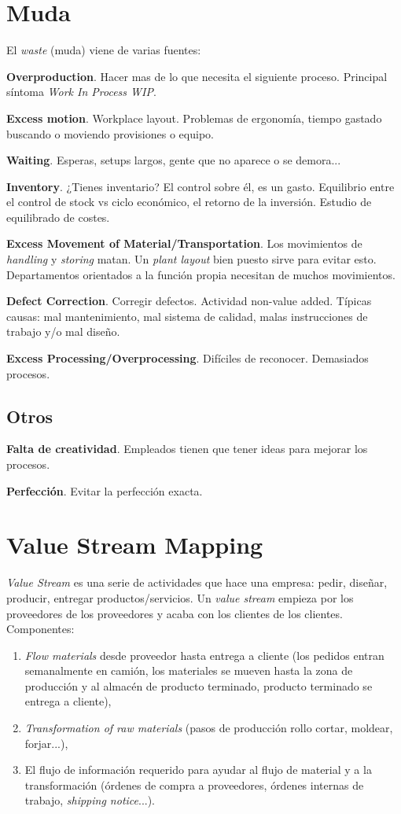 \documentclass[oneside]{book}
\begin{document}
\section{Muda}

El \textit{waste} (muda) viene de varias fuentes:

\textbf{Overproduction}. Hacer mas de lo que necesita el siguiente proceso. Principal síntoma \textit{Work In Process WIP}.

\textbf{Excess motion}. Workplace layout. Problemas de ergonomía, tiempo gastado buscando o moviendo provisiones o equipo.

\textbf{Waiting}. Esperas, setups largos, gente que no aparece o se demora...

\textbf{Inventory}. ¿Tienes inventario? El control sobre él, es un gasto. Equilibrio entre el control de stock vs ciclo económico, el retorno de la inversión. Estudio de equilibrado de costes.

\textbf{Excess Movement of Material/Transportation}. Los movimientos de \textit{handling} y \textit{storing} matan. Un \textit{plant layout} bien puesto sirve para evitar esto. Departamentos orientados a la función propia necesitan de muchos movimientos.

\textbf{Defect Correction}. Corregir defectos. Actividad non-value added. Típicas causas: mal mantenimiento, mal sistema de calidad, malas instrucciones de trabajo y/o mal diseño. 

\textbf{Excess Processing/Overprocessing}. Difíciles de reconocer. Demasiados procesos. 

\subsection{Otros}

\textbf{Falta de creatividad}. Empleados tienen que tener ideas para mejorar los procesos.

\textbf{Perfección}. Evitar la perfección exacta. 

\section{Value Stream Mapping} 

\textit{Value Stream} es una serie de actividades que hace una empresa: pedir, diseñar, producir, entregar productos/servicios. Un \textit{value stream} empieza por los proveedores de los proveedores y acaba con los clientes de los clientes. Componentes: \begin{enumerate} \item \textit{Flow materials} desde proveedor hasta entrega a cliente (los pedidos entran semanalmente en camión, los materiales se mueven hasta la zona de producción y al almacén de producto terminado, producto terminado se entrega a cliente), \item \textit{Transformation of raw materials} (pasos de producción rollo cortar, moldear, forjar...), \item El flujo de información requerido para ayudar al flujo de material y a la transformación (órdenes de compra a proveedores, órdenes internas de trabajo, \textit{shipping notice}...). \end{enumerate}
\end{document}
